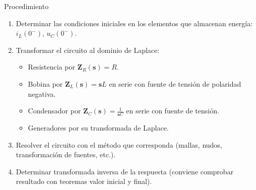 \documentclass[aspectratio=169, usenames,svgnames,dvipsnames]{beamer}
\newcommand{\slp}{\mathbf{s}}
\begin{document}
\begin{frame}[label={sec:orgea6a0d4}]{Procedimiento}
\begin{enumerate}
\item Determinar las \alert{condiciones iniciales} en los elementos que almacenan energía: \(i_L(0^-)\), \(u_C(0^-)\).
\item \alert{Transformar} el circuito \alert{al dominio de Laplace}:
\begin{itemize}
\item Resistencia por \(\mathbf{Z}_R(\slp) = R\).
\item Bobina por \(\mathbf{Z}_L(\slp) = \slp L\) en serie con fuente de tensión de polaridad negativa.
\item Condensador por \(\mathbf{Z}_C(\slp) = \frac{1}{\slp C}\) en serie con fuente de tensión.
\item Generadores por su transformada de Laplace.
\end{itemize}
\item \alert{Resolver el circuito} con el método que corresponda (mallas, nudos, transformación de fuentes, etc.).
\item Determinar \alert{transformada inversa} de la respuesta (conviene comprobar resultado con teoremas valor inicial y final).
\end{enumerate}
\end{frame}
\end{document}
